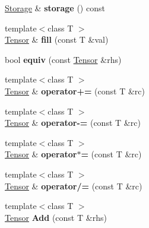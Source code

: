 \begin{DoxyCompactItemize}
\hyperlink{classcytnx_1_1Storage}{Storage} \& {\bfseries storage} () const
\item 
\mbox{\label{classcytnx_1_1Tensor_a674d9dd01d4b523117cf96561de93401}} 
{\footnotesize template$<$class T $>$ }\\\hyperlink{classcytnx_1_1Tensor}{Tensor} \& {\bfseries fill} (const T \&val)
\item 
\mbox{\label{classcytnx_1_1Tensor_aeae314f040e27b581d73c82b33ab6a59}} 
bool {\bfseries equiv} (const \hyperlink{classcytnx_1_1Tensor}{Tensor} \&rhs)
\item 
\mbox{\label{classcytnx_1_1Tensor_a14586eb5096b7c98465dc6081042922b}} 
{\footnotesize template$<$class T $>$ }\\\hyperlink{classcytnx_1_1Tensor}{Tensor} \& {\bfseries operator+=} (const T \&rc)
\item 
\mbox{\label{classcytnx_1_1Tensor_ab78b7d778d79c005ca5cc24385391075}} 
{\footnotesize template$<$class T $>$ }\\\hyperlink{classcytnx_1_1Tensor}{Tensor} \& {\bfseries operator-\/=} (const T \&rc)
\item 
\mbox{\label{classcytnx_1_1Tensor_a9ab679c8ccf4a9b8df95c3a622b98c2c}} 
{\footnotesize template$<$class T $>$ }\\\hyperlink{classcytnx_1_1Tensor}{Tensor} \& {\bfseries operator$\ast$=} (const T \&rc)
\item 
\mbox{\label{classcytnx_1_1Tensor_a7ba77e4d476866efbc330d48f1e6fbef}} 
{\footnotesize template$<$class T $>$ }\\\hyperlink{classcytnx_1_1Tensor}{Tensor} \& {\bfseries operator/=} (const T \&rc)
\item 
\mbox{\label{classcytnx_1_1Tensor_aafd7446e798d34427d4e6a9571861111}} 
{\footnotesize template$<$class T $>$ }\\\hyperlink{classcytnx_1_1Tensor}{Tensor} {\bfseries Add} (const T \&rhs)
\item 
\mbox{\label{classcytnx_1_1Tensor_ac7ab4b9ee38f619a60c26f203539db65}} 

\end{DoxyCompactItemize}
